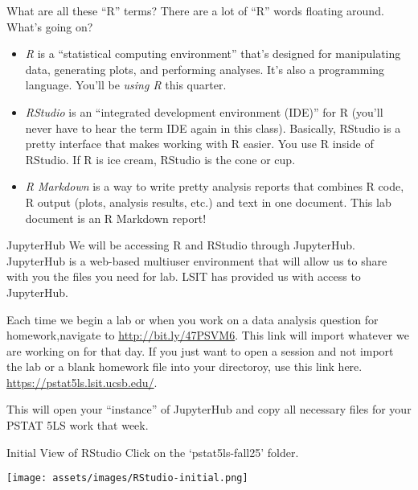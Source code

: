 \documentclass[
  ignorenonframetext,
]{beamer}
\providecommand{\tightlist}{%
  \setlength{\itemsep}{0pt}\setlength{\parskip}{0pt}}
\begin{document}
\begin{frame}{What are all these ``R'' terms?}
\label{what-are-all-these-r-terms}
There are a lot of ``R'' words floating around. What's going on?

\begin{itemize}
\tightlist
\item
  \emph{R} is a ``statistical computing environment'' that's designed
  for manipulating data, generating plots, and performing analyses. It's
  also a programming language. You'll be \emph{using R} this quarter.
\item
  \emph{RStudio} is an ``integrated development environment (IDE)'' for
  R (you'll never have to hear the term IDE again in this class).
  Basically, RStudio is a pretty interface that makes working with R
  easier. You use R inside of RStudio. If R is ice cream, RStudio is the
  cone or cup.
\item
  \emph{R Markdown} is a way to write pretty analysis reports that
  combines R code, R output (plots, analysis results, etc.) and text in
  one document. This lab document is an R Markdown report!
\end{itemize}
\end{frame}

\begin{frame}{JupyterHub}
\label{jupyterhub}
We will be accessing R and RStudio through JupyterHub. JupyterHub is a
web-based multiuser environment that will allow us to share with you the
files you need for lab. LSIT has provided us with access to JupyterHub.

Each time we begin a lab or when you work on a data analysis question
for homework,navigate to \url{http://bit.ly/47PSVM6}. This link will
import whatever we are working on for that day. If you just want to open
a session and not import the lab or a blank homework file into your
directoroy, use this link here. \url{https://pstat5ls.lsit.ucsb.edu/}.

This will open your ``instance'' of JupyterHub and copy all necessary
files for your PSTAT 5LS work that week.
\end{frame}

\begin{frame}{Initial View of RStudio}
\label{initial-view-of-rstudio}
Click on the `pstat5ls-fall25' folder.

\begin{center}
\texttt{[image: assets/images/RStudio-initial.png]}
\end{center}
\end{frame}
\end{document}
